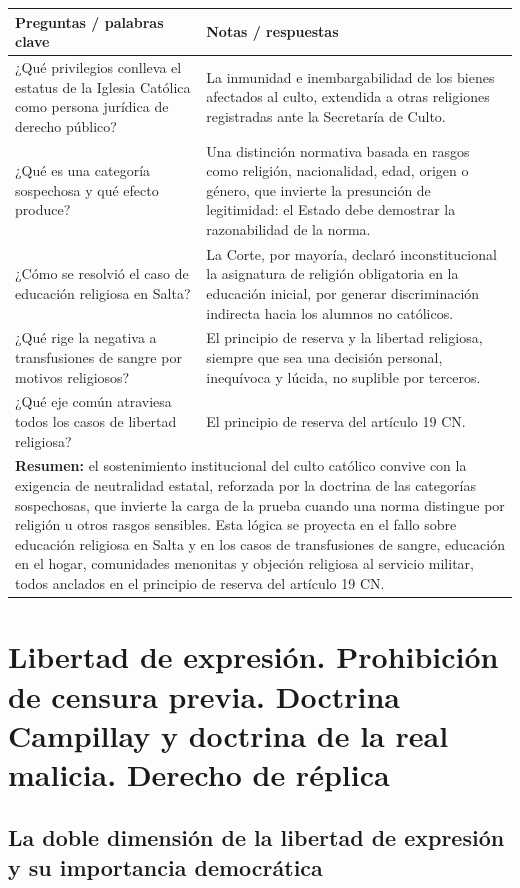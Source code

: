 \documentclass[12pt,oneside]{book}
\begin{document}
\begin{longtable}{@{}p{}p{}@{}}
\toprule
\textbf{Preguntas / palabras clave} & \textbf{Notas / respuestas} \\
\midrule
\endhead
¿Qué privilegios conlleva el estatus de la Iglesia Católica como persona jurídica
de derecho público? & La inmunidad e inembargabilidad de los bienes afectados al
culto, extendida a otras religiones registradas ante la Secretaría de Culto. \\
¿Qué es una categoría sospechosa y qué efecto produce? & Una distinción normativa
basada en rasgos como religión, nacionalidad, edad, origen o género, que invierte
la presunción de legitimidad: el Estado debe demostrar la razonabilidad de la
norma. \\
¿Cómo se resolvió el caso de educación religiosa en Salta? & La Corte, por
mayoría, declaró inconstitucional la asignatura de religión obligatoria en la
educación inicial, por generar discriminación indirecta hacia los alumnos no
católicos. \\
¿Qué rige la negativa a transfusiones de sangre por motivos religiosos? & El
principio de reserva y la libertad religiosa, siempre que sea una decisión
personal, inequívoca y lúcida, no suplible por terceros. \\
¿Qué eje común atraviesa todos los casos de libertad religiosa? & El principio de
reserva del artículo 19 CN. \\
\midrule
\multicolumn{2}{p{0.95\textwidth}}{\textbf{Resumen:} el sostenimiento
institucional del culto católico convive con la exigencia de neutralidad estatal,
reforzada por la doctrina de las categorías sospechosas, que invierte la carga de
la prueba cuando una norma distingue por religión u otros rasgos sensibles. Esta
lógica se proyecta en el fallo sobre educación religiosa en Salta y en los casos
de transfusiones de sangre, educación en el hogar, comunidades menonitas y
objeción religiosa al servicio militar, todos anclados en el principio de reserva
del artículo 19 CN.} \\
\bottomrule
\end{longtable}

\chapter{Libertad de expresión. Prohibición de censura previa. Doctrina Campillay y doctrina de la real malicia. Derecho de réplica}
\label{cap:p14}

\section{La doble dimensión de la libertad de expresión y su importancia democrática}
\end{document}

